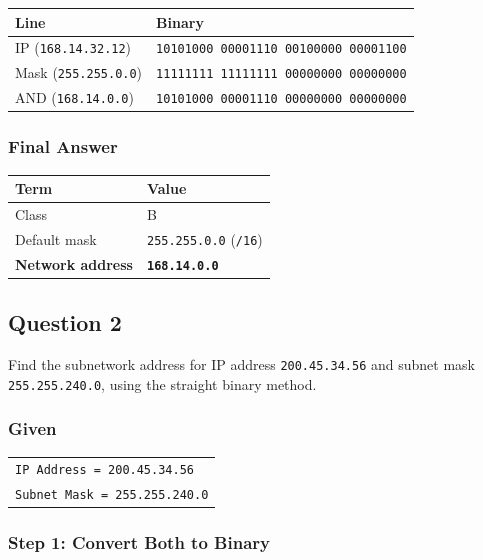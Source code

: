 \documentclass[11pt,a4paper]{article}
\begin{document}
\begin{tabularx}{\textwidth}{@{}lX@{}}
\toprule
\rowcolor{tablehead}\textbf{Line} & \textbf{Binary} \\
\midrule
IP (\texttt{168.14.32.12}) & \texttt{10101000 00001110 00100000 00001100} \\
Mask (\texttt{255.255.0.0}) & \texttt{11111111 11111111 00000000 00000000} \\
AND (\texttt{168.14.0.0}) & \texttt{10101000 00001110 00000000 00000000} \\
\bottomrule
\end{tabularx}
 
\subsubsection*{Final Answer}
 
\begin{tabularx}{\textwidth}{@{}lX@{}}
\toprule
\rowcolor{tablehead}\textbf{Term} & \textbf{Value} \\
\midrule
Class & B \\
Default mask & \texttt{255.255.0.0} (\texttt{/16}) \\
\textbf{Network address} & \textbf{\texttt{168.14.0.0}} \\
\bottomrule
\end{tabularx}

\subsection*{Question 2}

Find the subnetwork address for IP address \texttt{200.45.34.56} and subnet mask
\texttt{255.255.240.0}, using the straight binary method.

\subsubsection*{Given}

\begin{tabularx}{\textwidth}{@{}X@{}}
\texttt{IP Address = 200.45.34.56} \\
\texttt{Subnet Mask = 255.255.240.0} \\
\end{tabularx}

\subsubsection*{Step 1: Convert Both to Binary}
\end{document}
